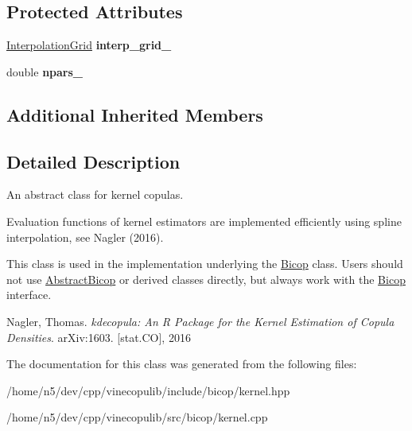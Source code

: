 \subsection*{Protected Attributes}
\begin{DoxyCompactItemize}
\item 
\hyperlink{classvinecopulib_1_1_interpolation_grid}{Interpolation\+Grid} {\bfseries interp\+\_\+grid\+\_\+}\hypertarget{classvinecopulib_1_1_kernel_bicop_aa8cfe1dd0786d692562252de05c46588}{}\label{classvinecopulib_1_1_kernel_bicop_aa8cfe1dd0786d692562252de05c46588}

\item 
double {\bfseries npars\+\_\+}\hypertarget{classvinecopulib_1_1_kernel_bicop_a1b49a0a2630e71079c08ebdca79b06b6}{}\label{classvinecopulib_1_1_kernel_bicop_a1b49a0a2630e71079c08ebdca79b06b6}

\end{DoxyCompactItemize}
\subsection*{Additional Inherited Members}


\subsection{Detailed Description}
An abstract class for kernel copulas. 

Evaluation functions of kernel estimators are implemented efficiently using spline interpolation, see Nagler (2016).

This class is used in the implementation underlying the \hyperlink{classvinecopulib_1_1_bicop}{Bicop} class. Users should not use \hyperlink{classvinecopulib_1_1_abstract_bicop}{Abstract\+Bicop} or derived classes directly, but always work with the \hyperlink{classvinecopulib_1_1_bicop}{Bicop} interface.

Nagler, Thomas. {\itshape kdecopula\+: An R Package for the Kernel Estimation of Copula Densities}. ar\+Xiv\+:1603. \mbox{[}stat.\+CO\mbox{]}, 2016 

The documentation for this class was generated from the following files\+:\begin{DoxyCompactItemize}
\item 
/home/n5/dev/cpp/vinecopulib/include/bicop/kernel.\+hpp\item 
/home/n5/dev/cpp/vinecopulib/src/bicop/kernel.\+cpp\end{DoxyCompactItemize}

